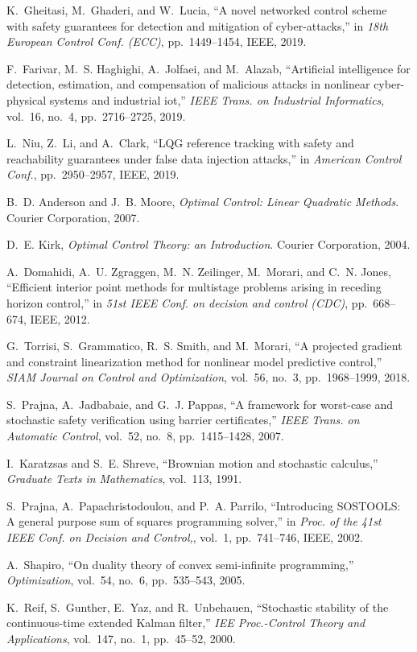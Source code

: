 \documentclass[journal]{IEEEtran}
\begin{document}
\begin{thebibliography}{10}
K.~Gheitasi, M.~Ghaderi, and W.~Lucia, ``A novel networked control scheme with
  safety guarantees for detection and mitigation of cyber-attacks,'' in {\em
  18th European Control Conf. (ECC)}, pp.~1449--1454, IEEE, 2019.

F.~Farivar, M.~S. Haghighi, A.~Jolfaei, and M.~Alazab, ``Artificial
  intelligence for detection, estimation, and compensation of malicious attacks
  in nonlinear cyber-physical systems and industrial iot,'' {\em IEEE Trans. on
  Industrial Informatics}, vol.~16, no.~4, pp.~2716--2725, 2019.

L.~Niu, Z.~Li, and A.~Clark, ``{LQG} reference tracking with safety and
  reachability guarantees under false data injection attacks,'' in {\em
  American Control Conf.}, pp.~2950--2957, IEEE, 2019.

B.~D. Anderson and J.~B. Moore, {\em Optimal Control: Linear Quadratic
  Methods}.
\newblock Courier Corporation, 2007.

D.~E. Kirk, {\em Optimal Control Theory: an Introduction}.
\newblock Courier Corporation, 2004.

A.~Domahidi, A.~U. Zgraggen, M.~N. Zeilinger, M.~Morari, and C.~N. Jones,
  ``Efficient interior point methods for multistage problems arising in
  receding horizon control,'' in {\em 51st IEEE Conf. on decision and control
  (CDC)}, pp.~668--674, IEEE, 2012.

G.~Torrisi, S.~Grammatico, R.~S. Smith, and M.~Morari, ``A projected gradient
  and constraint linearization method for nonlinear model predictive control,''
  {\em SIAM Journal on Control and Optimization}, vol.~56, no.~3,
  pp.~1968--1999, 2018.

S.~Prajna, A.~Jadbabaie, and G.~J. Pappas, ``A framework for worst-case and
  stochastic safety verification using barrier certificates,'' {\em IEEE Trans.
  on Automatic Control}, vol.~52, no.~8, pp.~1415--1428, 2007.

I.~Karatzsas and S.~E. Shreve, ``Brownian motion and stochastic calculus,''
  {\em Graduate Texts in Mathematics}, vol.~113, 1991.

S.~Prajna, A.~Papachristodoulou, and P.~A. Parrilo, ``Introducing {SOSTOOLS}: A
  general purpose sum of squares programming solver,'' in {\em Proc. of the
  41st IEEE Conf. on Decision and Control,}, vol.~1, pp.~741--746, IEEE, 2002.

A.~Shapiro, ``On duality theory of convex semi-infinite programming,'' {\em
  Optimization}, vol.~54, no.~6, pp.~535--543, 2005.

K.~Reif, S.~Gunther, E.~Yaz, and R.~Unbehauen, ``Stochastic stability of the
  continuous-time extended {Kalman} filter,'' {\em IEE Proc.-Control Theory and
  Applications}, vol.~147, no.~1, pp.~45--52, 2000.



\end{thebibliography}
\end{document}
